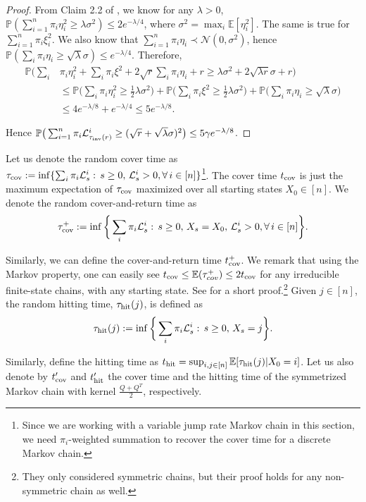 \documentclass[a4paper, 11pt]{article}
\renewcommand{\P}{\mathbb{P}}
\newcommand{\E}{\mathbb{E}}
\newcommand{\Ell}{\mathcal{L}}
\newcommand{\inv}{\tau_\textnormal{inv}}
\newcommand{\cov}{\textnormal{cov}}
\begin{document}
\begin{proof}
From Claim 2.2 of \cite{ding14}, we know for any $\lambda>0$, $\P(\sum_{i=1}^n \pi_i\eta_i^2\geq \lambda \sigma^2)\leq 2 e^{-\lambda/4}$, where $\sigma^2=\max_i\E[\eta_i^2]$. The same is true for $\sum_{i=1}^n \pi_i\xi_i^2$. We also know that $\sum_{i=1}^n \pi_i\eta_i\prec\mathcal{N}(0,\sigma^2)$, hence $\P(\sum_i\pi_i\eta_i\geq \sqrt{\lambda}\sigma)\leq e^{-\lambda/4}$. Therefore,
\begin{equation*}
\begin{aligned}
\P\bigg(\sum_i&\pi_i\eta_i^2 +\sum_i\pi_i\xi^2+2\sqrt{r}\sum_i\pi_i\eta_i+r\geq \lambda  \sigma^2+2\sqrt{\lambda r} \sigma+r\bigg)\\
&\leq \P\bigg(\sum_i\pi_i\eta_i^2\geq \frac{1}{2}\lambda   \sigma^2\bigg)+ \P\bigg(\sum_i\pi_i\xi^2\geq \frac{1}{2}\lambda  \sigma^2\bigg)+
\P\bigg(\sum_i \pi_i\eta_i\geq \sqrt{\lambda}\sigma \bigg)\\
&\leq 4e^{-\lambda/8}+e^{-\lambda/4}\leq 5e^{-\lambda/8}.
\end{aligned}
\end{equation*}

Hence $\P\big(\sum_{i=1}^n \pi_i\Ell_{\inv(r)}^i\geq (\sqrt{r}+\sqrt{\lambda }\sigma)^2\big)\leq 5\gamma e^{-\lambda/8}$.
\end{proof}

Let us denote the random cover time as $\tau_\cov:=\inf\{\sum_i\pi_i\Ell_s^i:\, s\geq 0,\,\Ell_s^i>0,\forall\,i\in[n]\}$\footnote{Since we are working with a variable jump rate Markov chain in this section, we need $\pi_i$-weighted summation to recover the cover time for a discrete Markov chain.}. The cover time $t_\cov$ is just the maximum expectation of $\tau_\cov$ maximized over all starting states $X_0\in[n]$. We denote the random cover-and-return time as
\[\tau_\cov^+:=\inf\bigg\{\sum_i\pi_i\Ell_s^i:\, s\geq 0,\, X_s=X_0,\,\Ell_s^i>0,\forall\,i\in[n]\bigg\}.\]

Similarly, we can define the cover-and-return time $t_\cov^+$. We remark that using the Markov property, one can easily see $t_\cov\leq \E(\tau_{cov}^+)\leq 2t_\cov$ for any irreducible finite-state chains, with any starting state. See \cite{dlp11} for a short proof.\footnote{They only considered symmetric chains, but their proof holds for any non-symmetric chain as well.} Given $j\in[n]$, the random hitting time, $\tau_{\textnormal{hit}}(j)$, is defined as
\[\tau_{\textnormal{hit}}(j):=\inf\bigg\{\sum_i\pi_i\Ell_s^i:\, s\geq 0,\, X_s=j\bigg\}.\]

Similarly, define the hitting time as $t_{\textnormal{hit}}=\sup_{i,j\in[n]}\E[\tau_{\textnormal{hit}}(j)|X_0=i]$. Let us also denote by $t_\cov'$ and $t_{\textnormal{hit}}'$ the cover time and the hitting time of the symmetrized Markov chain with kernel $\frac{Q+Q^T}{2}$, respectively.
\end{document}

